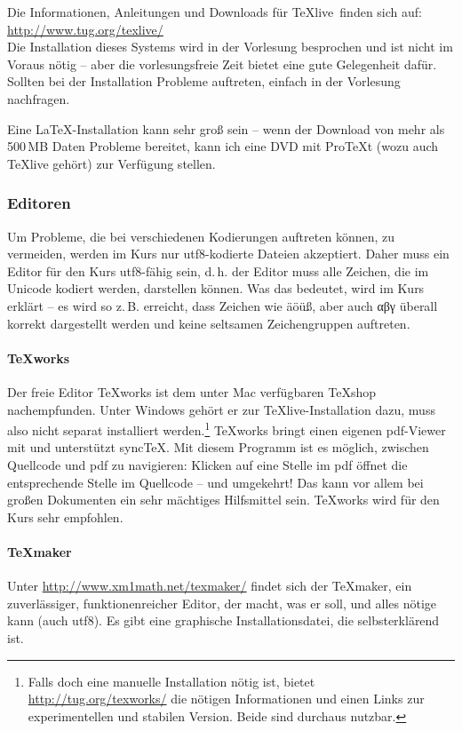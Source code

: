 \documentclass[12pt,ngerman]{scrartcl}
\newcommand{\TeXlive}{\TeX\textsf{live}\xspace}
\begin{document}
Die Informationen, Anleitungen und Downloads für \TeXlive\ finden sich auf:\\ \url{http://www.tug.org/texlive/}\\ Die Installation dieses Systems wird in der Vorlesung besprochen und ist nicht im Voraus nötig – aber die vorlesungsfreie Zeit bietet eine gute Gelegenheit dafür. Sollten bei der Installation Probleme auftreten, einfach in der Vorlesung nachfragen.

Eine \LaTeX-Installation kann sehr groß sein – wenn der Download von mehr als 500\,MB Daten Probleme bereitet, kann ich eine DVD mit Pro\TeX t (wozu auch \TeXlive gehört) zur Verfügung stellen.

\subsubsection{Editoren}
Um Probleme, die bei verschiedenen Kodierungen auftreten können, zu vermeiden, werden im Kurs nur utf8-kodierte Dateien akzeptiert. Daher muss ein Editor für den Kurs utf8-fähig sein, d.\,h. der Editor muss alle Zeichen, die im Unicode kodiert werden, darstellen können. Was das bedeutet, wird im Kurs erklärt – es wird so z.\,B. erreicht, dass Zeichen wie äöüß, aber auch αβγ überall korrekt dargestellt werden und keine seltsamen Zeichengruppen auftreten.

\paragraph{\TeX works}
Der freie Editor \TeX works ist dem unter Mac verfügbaren \TeX shop nachempfunden. Unter Windows gehört er zur \TeX live-Installation dazu, muss also nicht separat installiert werden.\footnote{Falls doch eine manuelle Installation nötig ist, bietet \url{http://tug.org/texworks/} die nötigen Informationen und einen Links zur experimentellen und stabilen Version. Beide sind durchaus nutzbar.} \TeX works bringt einen eigenen pdf-Viewer mit und unterstützt sync\TeX. Mit diesem Programm ist es möglich, zwischen Quellcode und pdf zu navigieren: Klicken auf eine Stelle im pdf öffnet die entsprechende Stelle im Quellcode – und umgekehrt! Das kann vor allem bei großen Dokumenten ein sehr mächtiges Hilfsmittel sein. \TeX works wird für den Kurs sehr empfohlen.

\paragraph{TeXmaker}
Unter \url{http://www.xm1math.net/texmaker/} findet sich der TeXmaker, ein zuverlässiger, funktionenreicher Editor, der macht, was er soll, und alles nötige kann (auch utf8). Es gibt eine graphische Installationsdatei, die selbsterklärend ist.
\end{document}
